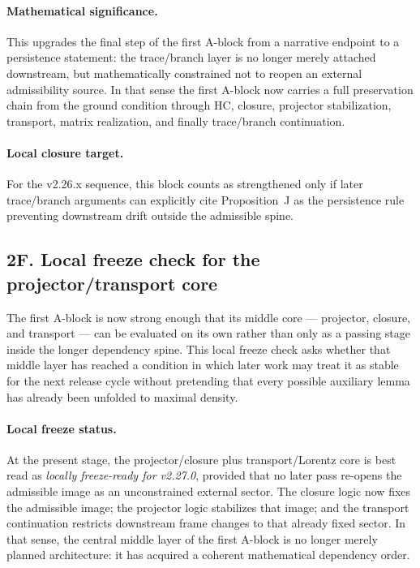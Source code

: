 \paragraph{Mathematical significance.}
This upgrades the final step of the first A-block from a narrative endpoint to a persistence statement: the trace/branch layer is no longer merely attached downstream, but mathematically constrained not to reopen an external admissibility source. In that sense the first A-block now carries a full preservation chain from the ground condition through HC, closure, projector stabilization, transport, matrix realization, and finally trace/branch continuation.

\paragraph{Local closure target.}
For the v2.26.x sequence, this block counts as strengthened only if later trace/branch arguments can explicitly cite Proposition~J as the persistence rule preventing downstream drift outside the admissible spine.

\subsection*{2F. Local freeze check for the projector/transport core}
The first A-block is now strong enough that its middle core --- projector,
closure, and transport --- can be evaluated on its own rather than only as a
passing stage inside the longer dependency spine. This local freeze check asks
whether that middle layer has reached a condition in which later work may treat
it as stable for the next release cycle without pretending that every possible
auxiliary lemma has already been unfolded to maximal density.

\paragraph{Local freeze status.}
At the present stage, the projector/closure plus transport/Lorentz core is best
read as \emph{locally freeze-ready for v2.27.0}, provided that no later pass
re-opens the admissible image as an unconstrained external sector. The closure
logic now fixes the admissible image; the projector logic stabilizes that
image; and the transport continuation restricts downstream frame changes to
that already fixed sector. In that sense, the central middle layer of the first
A-block is no longer merely planned architecture: it has acquired a coherent
mathematical dependency order.

